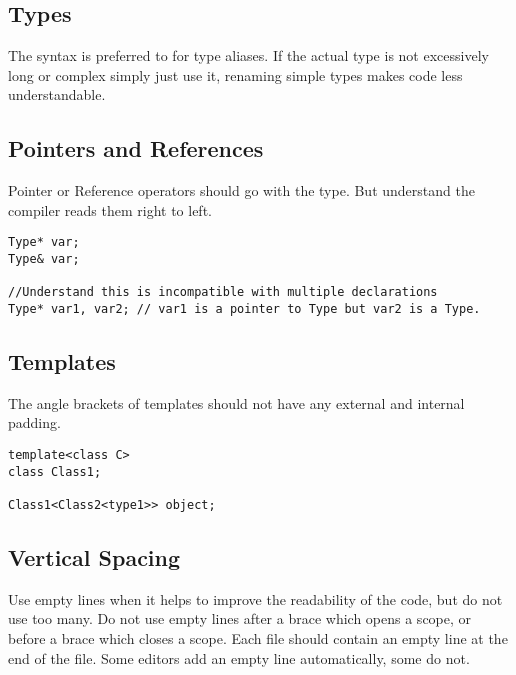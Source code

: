 \subsection{Types}
The  syntax is preferred to  for type aliases.
If the actual type is not excessively long or complex simply just use it, renaming simple types makes code less understandable.

\subsection{Pointers and References}
Pointer or Reference operators should go with the type. But understand the compiler reads them right to left.

\begin{lstlisting}
Type* var;
Type& var;

//Understand this is incompatible with multiple declarations
Type* var1, var2; // var1 is a pointer to Type but var2 is a Type.
\end{lstlisting}

\subsection{Templates}
The angle brackets of templates should not have any external and internal padding.
\begin{lstlisting}
template<class C>
class Class1;

Class1<Class2<type1>> object;
\end{lstlisting}

\subsection{Vertical Spacing}
Use empty lines when it helps to improve the readability of the code, but do not use too many.
Do not use empty lines after a brace which opens a scope,
or before a brace which closes a scope.
Each file should contain an empty line at the end of the file.
Some editors add an empty line automatically, some do not.

